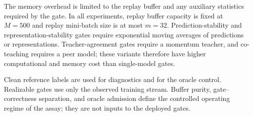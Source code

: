\documentclass[preprint,12pt]{elsarticle}
\begin{document}
The memory overhead is limited to the replay buffer and any auxiliary statistics required by the gate. In all experiments, replay buffer capacity is fixed at $M=500$ and replay mini-batch size is at most $m=32$. Prediction-stability and representation-stability gates require exponential moving averages of predictions or representations. Teacher-agreement gates require a momentum teacher, and co-teaching requires a peer model; these variants therefore have higher computational and memory cost than single-model gates.

Clean reference labels are used for diagnostics and for the oracle control. Realizable gates use only the observed training stream. Buffer purity, gate--correctness separation, and oracle admission define the controlled operating regime of the assay; they are not inputs to the deployed gates.
\end{document}
